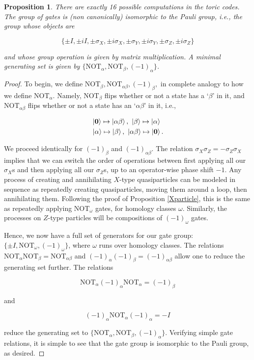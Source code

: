 \documentclass{article}
\newtheorem{proposition}{Proposition}[section]
\theoremstyle{definition}
\numberwithin{figure}{section}
\begin{document}
\begin{proposition}\label{Yparticle} There are exactly 16 possible computations in the toric codes. The group of gates is (non canonically) isomorphic to the Pauli group, i.e., the group whose objects are

$$\{\pm I, \pm iI, \pm \sigma_X, \pm i \sigma_X, \pm \sigma_Y, \pm i\sigma_Y, \pm \sigma_Z, \pm i \sigma_Z\}$$

and whose group operation is given by matrix multiplication. A minimal generating set is given by $\{\text{NOT}_{\alpha},\text{NOT}_{\beta},(-1)_{\alpha}\}$.
\end{proposition}
\begin{proof} To begin, we define $\text{NOT}_{\beta},\text{NOT}_{\alpha\beta},(-1)_{\beta},$ in complete analogy to how we define $\text{NOT}_{\alpha}$. Namely, $\text{NOT}_{\beta}$ flips whether or not a state has a `$\beta$' in it, and $\text{NOT}_{\alpha\beta}$ flips whether or not a state has an `$\alpha\beta$' in it, i.e.,

\begin{align*}
&\left|\bold{0}\right> \mapsto \left|\alpha\beta\right>,\,\, \left|\beta\right> \mapsto \left|\alpha\right> \\
&\left|\alpha\right> \mapsto \left|\beta\right>,\,\, \left|\alpha\beta\right> \mapsto \left|\bold{0}\right>.
\end{align*}

We proceed identically for $(-1)_{\beta}$ and $(-1)_{\alpha\beta}$. The relation $\sigma_X\sigma_Z=-\sigma_Z\sigma_X$ implies that we can switch the order of operations between first applying all our $\sigma_X$s and then applying all our $\sigma_Z$s, up to an operator-wise phase shift $-1$. Any process of creating and annihilating $X$-type quasiparticles can be modeled in sequence as repeatedly creating quasiparticles, moving them around a loop, then annihilating them. Following the proof of Proposition \ref{Xparticle}, this is the same as repeatedly applying $\text{NOT}_{\omega}$ gates, for homology classes $\omega$. Similarly, the processes on $Z$-type particles will be compositions of $(-1)_{\omega}$ gates.

Hence, we now have a full set of generators for our gate group: $\{\pm I, \text{NOT}_{\omega}, (-1)_{\omega}\}$, where $\omega$ runs over homology classes. The relations $\text{NOT}_{\alpha}\text{NOT}_{\beta}=\text{NOT}_{\alpha\beta}$ and $(-1)_{\alpha}(-1)_{\beta}=(-1)_{\alpha\beta}$ allow one to reduce the generating set further. The relations

$$\text{NOT}_{\alpha}(-1)_{\alpha}\text{NOT}_{\alpha}=(-1)_{\beta}$$

and

$$(-1)_{\alpha}\text{NOT}_{\alpha}(-1)_{\alpha}=-I$$

reduce the generating set to $\{\text{NOT}_{\alpha},\text{NOT}_{\beta},(-1)_{\alpha}\}$. Verifying simple gate relations, it is simple to see that the gate group is isomorphic to the Pauli group, as desired.
\end{proof}
\end{document}
